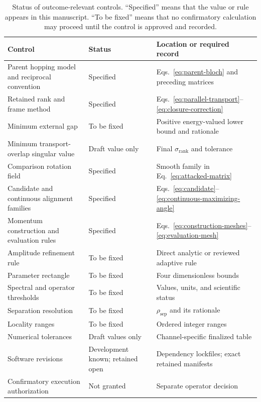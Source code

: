 \documentclass[11pt]{article}
\begin{document}
\begin{table}[htbp]
\centering
\caption{Status of outcome-relevant controls. ``Specified'' means that the value or rule
appears in this manuscript. ``To be fixed'' means that no confirmatory calculation may
proceed until the control is approved and recorded.}
\label{tab:controls}
\begin{tabular}{>{\raggedright\arraybackslash}p{}
                >{\raggedright\arraybackslash}p{}
                >{\raggedright\arraybackslash}p{}}
\toprule
Control & Status & Location or required record \\
\midrule
Parent hopping model and reciprocal convention & Specified &
Eqs.~\eqref{eq:parent-bloch} and preceding matrices \\
Retained rank and frame method & Specified &
Eqs.~\eqref{eq:parallel-transport}--\eqref{eq:closure-correction} \\
Minimum external gap & To be fixed & Positive energy-valued lower bound and rationale \\
Minimum transport-overlap singular value & Draft value only &
Final $\sigma_{\mathrm{rank}}$ and tolerance \\
Comparison rotation field & Specified & Smooth family in
Eq.~\eqref{eq:attacked-matrix} \\
Candidate and continuous alignment families & Specified &
Eqs.~\eqref{eq:candidate}--\eqref{eq:continuous-maximizing-angle} \\
Momentum construction and evaluation rules & Specified &
Eqs.~\eqref{eq:construction-meshes}--\eqref{eq:evaluation-mesh} \\
Amplitude refinement rule & To be fixed & Direct analytic or reviewed adaptive rule \\
Parameter rectangle & To be fixed & Four dimensionless bounds \\
Spectral and operator thresholds & To be fixed & Values, units, and scientific status \\
Separation resolution & To be fixed & $\rho_{\mathrm{sep}}$ and its rationale \\
Locality ranges & To be fixed & Ordered integer ranges \\
Numerical tolerances & Draft values only & Channel-specific finalized table \\
Software revisions & Development known; retained open &
Dependency lockfiles; exact retained manifests \\
Confirmatory execution authorization & Not granted & Separate operator decision \\
\bottomrule
\end{tabular}
\end{table}
\end{document}
